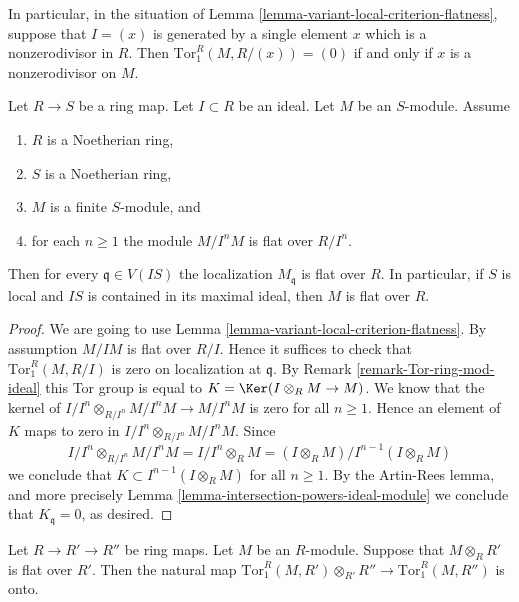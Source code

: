 \noindent
In particular, in the situation of
Lemma \ref{lemma-variant-local-criterion-flatness}, suppose that
$I = (x)$ is generated by a single element $x$ which is
a nonzerodivisor in $R$. Then $\text{Tor}_1^R(M, R/(x)) = (0)$
if and only if $x$ is a nonzerodivisor on $M$.

\begin{lemma}
\label{lemma-flat-module-powers}
Let $R \to S$ be a ring map. Let $I \subset R$ be an ideal.
Let $M$ be an $S$-module. Assume
\begin{enumerate}
\item $R$ is a Noetherian ring,
\item $S$ is a Noetherian ring,
\item $M$ is a finite $S$-module, and
\item for each $n \geq 1$ the module $M/I^n M$ is flat over
$R/I^n$.
\end{enumerate}
Then for every $\mathfrak q \in V(IS)$
the localization $M_{\mathfrak q}$ is flat over $R$.
In particular, if $S$ is local and $IS$ is contained
in its maximal ideal, then $M$ is flat over $R$.
\end{lemma}

\begin{proof}
We are going to use
Lemma \ref{lemma-variant-local-criterion-flatness}.
By assumption $M/IM$ is flat over $R/I$. Hence it suffices to check
that $\text{Tor}_1^R(M, R/I)$ is zero on localization at $\mathfrak q$. By
Remark \ref{remark-Tor-ring-mod-ideal}
this Tor group is equal to $K = \Ker(I \otimes_R M \to M)$.
We know that the kernel of
$I/I^n \otimes_{R/I^n} M/I^nM \to M/I^nM$ is zero for all $n \geq 1$.
Hence an element of $K$ maps to zero in $I/I^n \otimes_{R/I^n} M/I^nM$.
Since
$$
I/I^n \otimes_{R/I^n} M/I^nM = I/I^n \otimes_R M =
(I \otimes_R M)/I^{n - 1}(I \otimes_R M)
$$
we conclude that $K \subset I^{n - 1}(I \otimes_R M)$ for all $n \geq 1$.
By the Artin-Rees lemma, and more precisely
Lemma \ref{lemma-intersection-powers-ideal-module}
we conclude that $K_{\mathfrak q} = 0$, as desired.
\end{proof}

\begin{lemma}
\label{lemma-surjective-on-tor-one}
Let $R \to R' \to R''$ be ring maps.
Let $M$ be an $R$-module. Suppose that $M \otimes_R R'$
is flat over $R'$. Then the natural map
$\text{Tor}_1^R(M, R') \otimes_{R'} R'' \to
\text{Tor}_1^R(M, R'')$ is onto.
\end{lemma}


